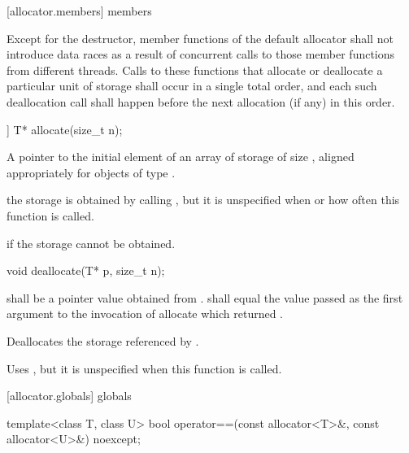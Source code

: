 [allocator.members]{ members}

\pnum
Except for the destructor, member functions of the default allocator shall not introduce
data races as a result of concurrent calls to those member
functions from different threads. Calls to these functions that allocate or deallocate a
particular unit of storage shall occur in a single total order, and each such
deallocation call shall happen before the next allocation (if any) in this order.

%
\begin{itemdecl}
[[nodiscard]] T* allocate(size_t n);
\end{itemdecl}

\begin{itemdescr}
\pnum
\returns
A pointer to the initial element of an array of storage of size 
, aligned appropriately for objects of type .

\pnum
\remarks
the storage is obtained by calling ,
but it is unspecified when or how often this
function is called.

\pnum
\throws
{} if the storage cannot be obtained.
\end{itemdescr}

%
\begin{itemdecl}
void deallocate(T* p, size_t n);
\end{itemdecl}

\begin{itemdescr}
\pnum
\requires
{} shall be a pointer value obtained from .
 shall equal the value passed as the first argument
to the invocation of allocate which returned .

\pnum
\effects
Deallocates the storage referenced by  .

\pnum
\remarks
Uses
,
but it is unspecified
when this function is called.
\end{itemdescr}

[allocator.globals]{ globals}

%
\begin{itemdecl}
template<class T, class U>
  bool operator==(const allocator<T>&, const allocator<U>&) noexcept;
\end{itemdecl}


